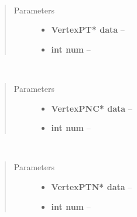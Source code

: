 \documentclass[letterpaper,10pt,english]{sphinxmanual}
\begin{document}

\begin{fulllineitems}
\label{gl:VBO::setVertexData__VertexPTP.i}~\begin{quote}\begin{description}
\item[{Parameters}] \leavevmode\begin{itemize}
\item {} 
\textbf{VertexPT* data} -- 

\item {} 
\textbf{int num} -- 

\end{itemize}

\end{description}\end{quote}

\end{fulllineitems}


\begin{fulllineitems}
\label{gl:VBO::setVertexData__VertexPNCP.i}~\begin{quote}\begin{description}
\item[{Parameters}] \leavevmode\begin{itemize}
\item {} 
\textbf{VertexPNC* data} -- 

\item {} 
\textbf{int num} -- 

\end{itemize}

\end{description}\end{quote}

\end{fulllineitems}


\begin{fulllineitems}
\label{gl:VBO::setVertexData__VertexPTNP.i}~\begin{quote}\begin{description}
\item[{Parameters}] \leavevmode\begin{itemize}
\item {} 
\textbf{VertexPTN* data} -- 

\item {} 
\textbf{int num} -- 

\end{itemize}

\end{description}\end{quote}

\end{fulllineitems}
\end{document}
